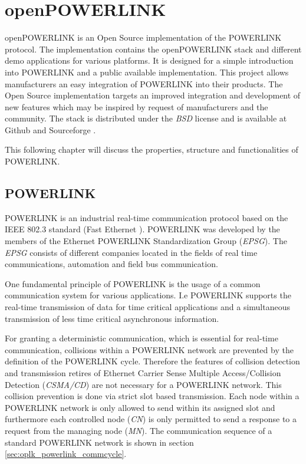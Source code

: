 \chapter{openPOWERLINK}
\label{cha:oplk}
openPOWERLINK is an Open Source implementation of the POWERLINK protocol.
The implementation contains the openPOWERLINK stack and different demo applications for various platforms.
It is designed for a simple introduction into POWERLINK and a public available implementation.
This project allows manufacturers an easy integration of POWERLINK into their products.
The Open Source implementation targets an improved integration and development of new features which may be inspired by request of manufacturers and the community.
The stack is distributed under the \emph{BSD} license and is available at Github \cite{openpowerlink_github} and Sourceforge \cite{openpowerlink_sourceforge}.

This following chapter will discuss the properties, structure and functionalities of POWERLINK.

\section{POWERLINK}
\label{sec:oplk_powerlink}
POWERLINK is an industrial real-time communication protocol based on the IEEE 802.3 standard (Fast Ethernet \cite{ethernet_ieee_2016}).
POWERLINK was developed by the members of the Ethernet POWERLINK Standardization Group (\emph{EPSG}).
The \emph{EPSG} consists of different companies located in the fields of real time communications, automation and field bus communication. \cite{epsg_hp}

One fundamental principle of POWERLINK is the usage of a common communication system for various applications.
I.e POWERLINK supports the real-time transmission of data for time critical applications and a simultaneous transmission of less time critical asynchronous information.

For granting a deterministic communication, which is essential for real-time communication, collisions within a POWERLINK network are prevented by the definition of the POWERLINK cycle.
Therefore the features of collision detection and transmission retires of Ethernet Carrier Sense Multiple Access/Collision Detection (\emph{CSMA/CD}) are not necessary for a POWERLINK network. \cite[section 4.2]{ethernet_ieee_2016}
This collision prevention is done via strict slot based transmission.
Each node within a POWERLINK network is only allowed to send within its assigned slot and furthermore each controlled node (\emph{CN}) is only permitted to send a response to a request from the managing node (\emph{MN}). \cite[chapter 1]{epsg_epsg_2013}
The communication sequence of a standard POWERLINK network is shown in section \ref{sec:oplk_powerlink_commcycle}.

